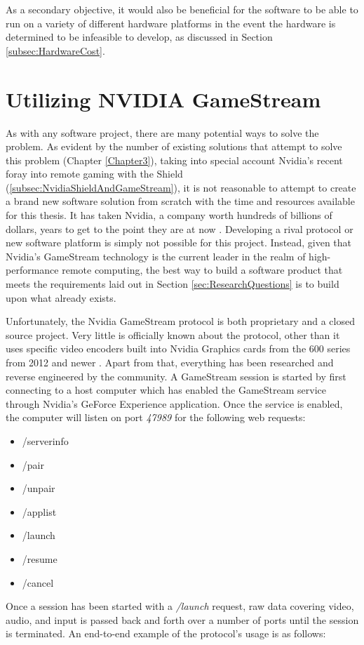 As a secondary objective, it would also be beneficial for the software to be able to run on a variety of different hardware platforms in the event the hardware is determined to be infeasible to develop, as discussed in Section \ref{subsec:HardwareCost}.

\section{Utilizing NVIDIA GameStream}\label{sec:UtilizingNVIDIAGameStream}

As with any software project, there are many potential ways to solve the problem.
As evident by the number of existing solutions that attempt to solve this problem (Chapter \ref{Chapter3}), taking into special account Nvidia's recent foray into remote gaming with the Shield (\ref{subsec:NvidiaShieldAndGameStream}), it is not reasonable to attempt to create a brand new software solution from scratch with the time and resources available for this thesis.
It has taken Nvidia, a company worth hundreds of billions of dollars, years to get to the point they are at now \cite{brown_2013}.
Developing a rival protocol or new software platform is simply not possible for this project.
Instead, given that Nvidia's GameStream technology is the current leader in the realm of high-performance remote computing, the best way to build a software product that meets the requirements laid out in Section \ref{sec:ResearchQuestions} is to build upon what already exists.

Unfortunately, the Nvidia GameStream protocol is both proprietary and a closed source project.
Very little is officially known about the protocol, other than it uses specific video encoders built into Nvidia Graphics cards from the 600 series from 2012 and newer \cite{gamestream_userguide}.
Apart from that, everything has been researched and reverse engineered by the community.
A GameStream session is started by first connecting to a host computer which has enabled the GameStream service through Nvidia's GeForce Experience application.
Once the service is enabled, the computer will listen on port \emph{47989} for the following web requests:
\begin{itemize}
  \item /serverinfo
  \item /pair
  \item /unpair
  \item /applist
  \item /launch
  \item /resume
  \item /cancel
\end{itemize}
Once a session has been started with a \emph{/launch} request, raw data covering video, audio, and input is passed back and forth over a number of ports until the session is terminated.
An end-to-end example of the protocol's usage is as follows:

